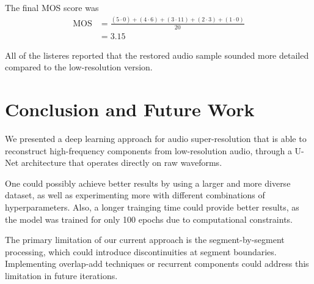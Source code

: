 \documentclass{article}
\begin{document}
The final MOS score was
\begin{align*}
    \text{MOS} &= \frac{(5 \cdot 0) + (4 \cdot 6) + (3 \cdot 11) + (2 \cdot 3) + (1 \cdot 0)}{20} \\
    &= 3.15
\end{align*}

All of the listeres reported that the restored audio sample sounded more detailed compared to the low-resolution version.

\section{Conclusion and Future Work}

We presented a deep learning approach for audio super-resolution that is able to reconstruct high-frequency components from low-resolution audio, through a U-Net architecture that operates directly on raw waveforms.

One could possibly achieve better results by using a larger and more diverse dataset, as well as experimenting more with different combinations of hyperparameters.
Also, a longer trainging time could provide better results, as the model was trained for only 100 epochs due to computational constraints.

The primary limitation of our current approach is the segment-by-segment processing, which could introduce discontinuities at segment boundaries.
Implementing overlap-add techniques or recurrent components could address this limitation in future iterations.



\end{document}
